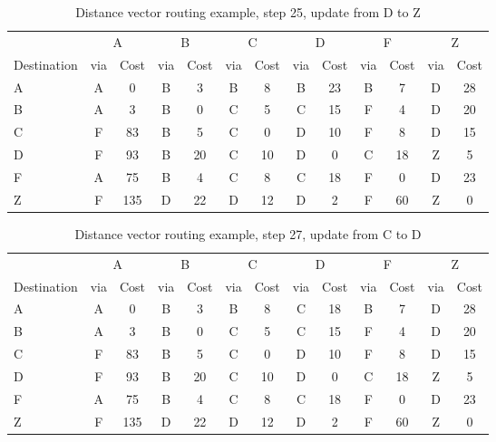 \begin{table}
    \caption{Distance vector  routing example, step 25, update from D to Z }
    \label{tab:dv:step:25}
\begin{tabular}{l|c|c|c|c|c|c|c|c|c|c|c|c}
    \toprule
      & \multicolumn{2}{c|}{A}&\multicolumn{2}{c|}{B}&\multicolumn{2}{c|}{C}&\multicolumn{2}{c|}{D}&\multicolumn{2}{c|}{F}&\multicolumn{2}{c|}{Z} \\
    Destination & via&Cost&via&Cost&via&Cost&via&Cost&via&Cost&via&Cost \\ 
    \midrule
    A & A & 0 &B & 3 &B & 8 &B & 23 &B & 7 &D & 28 
 \\B & A & 3 &B & 0 &C & 5 &C & 15 &F & 4 &D & 20 
 \\C & F & 83 &B & 5 &C & 0 &D & 10 &F & 8 &D & 15 
 \\D & F & 93 &B & 20 &C & 10 &D & 0 &C & 18 &Z & 5 
 \\F & A & 75 &B & 4 &C & 8 &C & 18 &F & 0 &D & 23 
 \\Z & F & 135 &D & 22 &D & 12 &D & 2 &F & 60 &Z & 0 
    \\ \bottomrule 
\end{tabular}
\end{table}
    

\begin{table}
    \caption{Distance vector  routing example, step 27, update from C to D }
    \label{tab:dv:step:27}
\begin{tabular}{l|c|c|c|c|c|c|c|c|c|c|c|c}
    \toprule
      & \multicolumn{2}{c|}{A}&\multicolumn{2}{c|}{B}&\multicolumn{2}{c|}{C}&\multicolumn{2}{c|}{D}&\multicolumn{2}{c|}{F}&\multicolumn{2}{c|}{Z} \\
    Destination & via&Cost&via&Cost&via&Cost&via&Cost&via&Cost&via&Cost \\ 
    \midrule
    A & A & 0 &B & 3 &B & 8 &C & 18 &B & 7 &D & 28 
 \\B & A & 3 &B & 0 &C & 5 &C & 15 &F & 4 &D & 20 
 \\C & F & 83 &B & 5 &C & 0 &D & 10 &F & 8 &D & 15 
 \\D & F & 93 &B & 20 &C & 10 &D & 0 &C & 18 &Z & 5 
 \\F & A & 75 &B & 4 &C & 8 &C & 18 &F & 0 &D & 23 
 \\Z & F & 135 &D & 22 &D & 12 &D & 2 &F & 60 &Z & 0 
    \\ \bottomrule 
\end{tabular}
\end{table}
    

